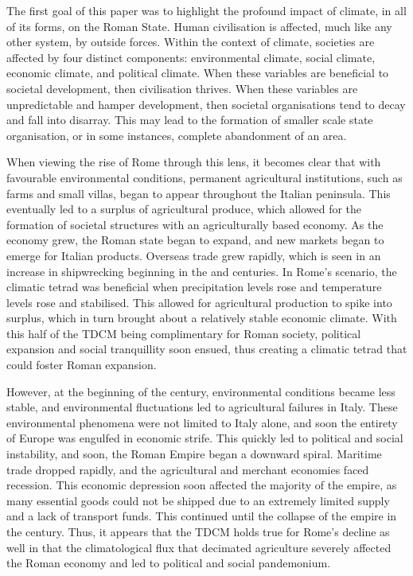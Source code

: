 

The first goal of this paper was to highlight the profound impact of climate, in all of its forms, on the Roman State. Human civilisation is affected, much like any other system, by outside forces. Within the context of climate, societies are affected by four distinct components: environmental climate, social climate, economic climate, and political climate. When these variables are beneficial to societal development, then civilisation thrives. When these variables are unpredictable and hamper development, then societal organisations tend to decay and fall into disarray. This may lead to the formation of smaller scale state organisation, or in some instances, complete abandonment of an area. 

When viewing the rise of Rome through this lens, it becomes clear that with favourable environmental conditions, permanent agricultural institutions, such as farms and small villas, began to appear throughout the Italian peninsula. This eventually led to a surplus of agricultural produce, which allowed for the formation of societal structures with an agriculturally based economy. As the economy grew, the Roman state began to expand, and new markets began to emerge for Italian products. Overseas trade grew rapidly, which is seen in an increase in shipwrecking beginning in the  and  centuries\BC. In Rome’s scenario, the climatic tetrad was beneficial when precipitation levels rose and temperature levels rose and stabilised. This allowed for agricultural production to spike into surplus, which in turn brought about a relatively stable economic climate. With this half of the TDCM being complimentary for Roman society, political expansion and social tranquillity soon ensued, thus creating a climatic tetrad that could foster Roman expansion.

However, at the beginning of the  century\AD, environmental conditions became less stable, and environmental fluctuations led to agricultural failures in Italy. These environmental phenomena were not limited to Italy alone, and soon the entirety of Europe was engulfed in economic strife. This quickly led to political and social instability, and soon, the Roman Empire began a downward spiral. Maritime trade dropped rapidly, and the agricultural and merchant economies faced recession. This economic depression soon affected the majority of the empire, as many essential goods could not be shipped due to an extremely limited supply and a lack of transport funds. This continued until the collapse of the empire in the  century\AD. Thus, it appears that the TDCM holds true for Rome’s decline as well in that the climatological flux that decimated agriculture severely affected the Roman economy and led to political and social pandemonium. 

